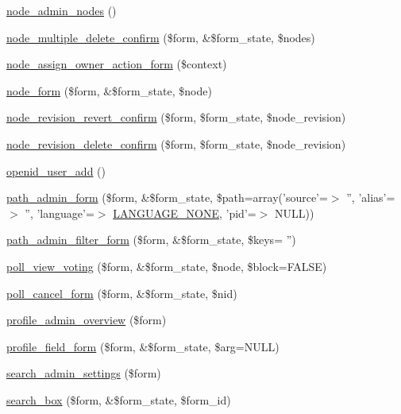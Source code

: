 \begin{DoxyCompactItemize}
\item 
\hyperlink{group__forms_ga3fb56c702a3c16eddd2fcd8ccd3e4adb}{node\_\-admin\_\-nodes} ()
\item 
\hyperlink{group__forms_ga25cc06a5aa3aa17eadc5a8a97e7c5e9e}{node\_\-multiple\_\-delete\_\-confirm} (\$form, \&\$form\_\-state, \$nodes)
\item 
\hyperlink{group__forms_ga427eee96a0ab2c2048a39fafcb6c4173}{node\_\-assign\_\-owner\_\-action\_\-form} (\$context)
\item 
\hyperlink{group__forms_ga267299500e205db099ee4e8396769d3f}{node\_\-form} (\$form, \&\$form\_\-state, \$node)
\item 
\hyperlink{group__forms_ga755acf87a0cd1c4d9d457843656c397b}{node\_\-revision\_\-revert\_\-confirm} (\$form, \$form\_\-state, \$node\_\-revision)
\item 
\hyperlink{group__forms_gae46b8603fe31b65546854c92d5923b68}{node\_\-revision\_\-delete\_\-confirm} (\$form, \$form\_\-state, \$node\_\-revision)
\item 
\hyperlink{group__forms_ga53081778c1fc8e8ff8ab89f9000774b7}{openid\_\-user\_\-add} ()
\item 
\hyperlink{group__forms_ga712dc47396e1cfb8f1872920973db244}{path\_\-admin\_\-form} (\$form, \&\$form\_\-state, \$path=array('source'=$>$ '', 'alias'=$>$ '', 'language'=$>$ \hyperlink{bootstrap_8inc_a9e91e2136aa0ce5c5e80f06aa3ad8266}{LANGUAGE\_\-NONE}, 'pid'=$>$ NULL))
\item 
\hyperlink{group__forms_ga2ef41a9ef077b1b4c0fbfa2971c155d1}{path\_\-admin\_\-filter\_\-form} (\$form, \&\$form\_\-state, \$keys= '')
\item 
\hyperlink{group__forms_gace728421201ee0db5c34bfadcf11c4cc}{poll\_\-view\_\-voting} (\$form, \&\$form\_\-state, \$node, \$block=FALSE)
\item 
\hyperlink{group__forms_ga15cf9694bfdb20243340a8c7168d441c}{poll\_\-cancel\_\-form} (\$form, \&\$form\_\-state, \$nid)
\item 
\hyperlink{group__forms_gafea18af3496251513291ed1ddc563fcc}{profile\_\-admin\_\-overview} (\$form)
\item 
\hyperlink{group__forms_ga05b59d1f5368616b5bf775acbb3f87e7}{profile\_\-field\_\-form} (\$form, \&\$form\_\-state, \$arg=NULL)
\item 
\hyperlink{group__forms_gaa2b01af13156640d290f3a3c6042bd3a}{search\_\-admin\_\-settings} (\$form)
\item 
\hyperlink{group__forms_ga745b25ef751b20947460eb353f3be2af}{search\_\-box} (\$form, \&\$form\_\-state, \$form\_\-id)

\end{DoxyCompactItemize}
